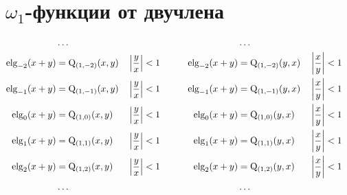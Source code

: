 
\section{$\omega_1$-функции от двучлена}

\begin{equation*} \begin{aligned}
&\ldots &&&&& &\ldots \\
%
\elg_{-2}(x + y) &= \mathrm{Q}_{(1,-2)}(x, y) &
&\left| \frac{y}{x} \right| < 1 &
&\quad &
\elg_{-2}(x + y) &= \mathrm{Q}_{(1,-2)}(y, x) & 
&\left| \frac{x}{y} \right| < 1 \\
%
\elg_{-1}(x + y) &= \mathrm{Q}_{(1,-1)}(x, y) & 
&\left| \frac{y}{x} \right| < 1 &
&\quad &
\elg_{-1}(x + y) &= \mathrm{Q}_{(1,-1)}(y, x) & 
&\left| \frac{x}{y} \right| < 1 \\
%
\elg_0(x + y) &= \mathrm{Q}_{(1,0)}(x, y) & 
&\left| \frac{y}{x} \right| < 1 &
&\quad &
\elg_0(x + y) &= \mathrm{Q}_{(1,0)}(y, x) & 
&\left| \frac{x}{y} \right| < 1 \\
%
\elg_1(x + y) &= \mathrm{Q}_{(1,1)}(x, y) & 
&\left| \frac{y}{x} \right| < 1 &
&\quad &
\elg_1(x + y) &= \mathrm{Q}_{(1,1)}(y, x) & 
&\left| \frac{x}{y} \right| < 1 \\
%
\elg_2(x + y) &= \mathrm{Q}_{(1,2)}(x, y) & 
&\left| \frac{y}{x} \right| < 1 &
&\quad &
\elg_2(x + y) &= \mathrm{Q}_{(1,2)}(y, x) & 
&\left| \frac{x}{y} \right| < 1 \\
%
&\ldots &&&&& &\ldots \\
\end{aligned} \end{equation*}